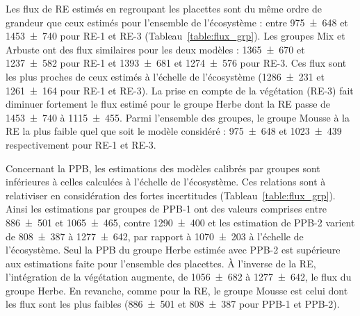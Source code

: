 Les flux de RE estimés en regroupant les placettes sont du même ordre de grandeur que ceux estimés pour l'ensemble de l'écosystème : entre \num{975(648)} et \SI{1453(740)}{\gcma} pour RE-1 et RE-3 (Tableau~\ref{table:flux_grp}).
Les groupes Mix et Arbuste ont des flux similaires pour les deux modèles : \num{1365(670)} et \SI{1237(582)}{\gcma} pour RE-1 et \num{1393(681)} et \SI{1274(576)}{\gcma} pour RE-3.
Ces flux sont les plus proches de ceux estimés à l'échelle de l'écosystème (\num{1286(231)} et \SI{1261(164)}{\gcma} pour RE-1 et RE-3).
La prise en compte de la végétation (RE-3) fait diminuer fortement le flux estimé pour le groupe Herbe dont la RE passe de \num{1453(740)} à \SI{1115(455)}{\gcma}.
Parmi l'ensemble des groupes, le groupe Mousse à la RE la plus faible quel que soit le modèle considéré : \num{975(648)} et \SI{1023(439)}{\gcma} respectivement pour RE-1 et RE-3.

Concernant la PPB, les estimations des modèles calibrés par groupes sont inférieures à celles calculées à l'échelle de l'écosystème.
Ces relations sont à relativiser en considération des fortes incertitudes (Tableau~\ref{table:flux_grp}).
Ainsi les estimations par groupes de PPB-1 ont des valeurs comprises entre \num{886(501)} et \SI{1065(465)}{\gcma}, contre \SI{1290(400)}{\gcma} et les estimation de PPB-2 varient de \num{808(387)} à \SI{1277(642)}{\gcma}, par rapport à \SI{1070(203)}{\gcma} à l'échelle de l'écosystème.
Seul la PPB du groupe Herbe estimée avec PPB-2 est supérieure aux estimations faite pour l'ensemble des placettes.
À l'inverse de la RE, l'intégration de la végétation augmente, de \num{1056(682)} à \SI{1277(642)}{\gcma}, le flux du groupe Herbe.
En revanche, comme pour la RE, le groupe Mousse est celui dont les flux sont les plus faibles (\num{886(501)} et \SI{808(387)}{\gcma} pour PPB-1 et PPB-2).

